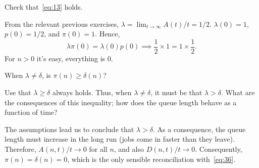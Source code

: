\begin{exercise}\label{ex:l-152}
 Check that~\cref{eq:13} holds.
\begin{solution}
From the relevant previous exercises, $\lambda = \lim_{t\to\infty} A(t)/t = 1/2$. $\lambda(0)=1$, $p(0)=1/2$, and $\pi(0)=1$. Hence,
\begin{equation*}
 \lambda \pi(0) = \lambda(0) p(0) \implies \frac 1 2 \times 1 = 1\times \frac 1 2.
\end{equation*}
For $n>0$ it's easy, everything is 0.
\end{solution}
\end{exercise}

\begin{exercise}\label{ex:26}
 When $\lambda\neq \delta$, is $\pi(n)\geq \delta(n)$?
\begin{hint}
 Use that $\lambda \geq \delta$ always holds. Thus, when $\lambda \neq \delta$, it must be that $\lambda > \delta$. What are the consequences of this inequality; how does the queue length behave as a function of time?
\end{hint}
\begin{solution}
 The assumptions lead us to conclude that $\lambda > \delta$. As a consequence, the queue length must increase in the long run (jobs come in faster than they leave). Therefore, $A(n,t)/t \to 0$ for all $n$, and also $D(n,t)/t\to 0$. Consequently, $\pi(n) = \delta(n) = 0$, which is the only sensible reconciliation with~\cref{eq:36}.
\end{solution}
\end{exercise}



